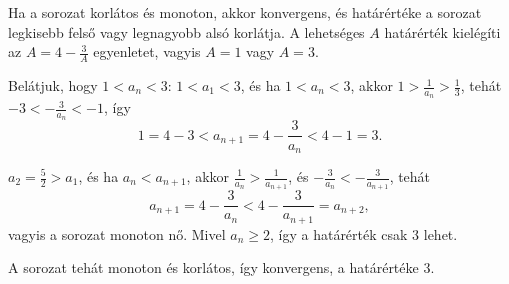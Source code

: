 \documentclass[11pt]{scrartcl}
\begin{document}
Ha a sorozat korlátos és monoton, akkor konvergens, és határértéke a sorozat
legkisebb felső vagy legnagyobb alsó korlátja. A lehetséges $A$ határérték
kielégíti az $A = 4 - \frac{3}{A}$ egyenletet, vagyis $A = 1$ vagy $A = 3$.

Belátjuk, hogy $1 < a_n < 3$: $1 < a_1 < 3$, és ha $1 < a_n < 3$, akkor
$1 > \frac{1}{a_n} > \frac{1}{3}$, tehát $-3 < -\frac{3}{a_n} < -1$, így
\[
	1 = 4 - 3 < a_{n + 1} = 4 - \frac{3}{a_n} < 4 - 1 = 3.
\]

$a_2 = \frac{5}{2} > a_1$, és ha $a_n < a_{n + 1}$, akkor
$\frac{1}{a_n} > \frac{1}{a_{n + 1}}$, és
$-\frac{3}{a_n} < -\frac{3}{a_{n + 1}}$, tehát
\[
	a_{n + 1} = 4 - \frac{3}{a_n} < 4 - \frac{3}{a_{n + 1}} = a_{n + 2},
\]
vagyis a sorozat monoton nő. Mivel $a_n \ge 2$, így a határérték csak $3$
lehet.

A sorozat tehát monoton és korlátos, így konvergens, a határértéke $3$.
\end{document}
